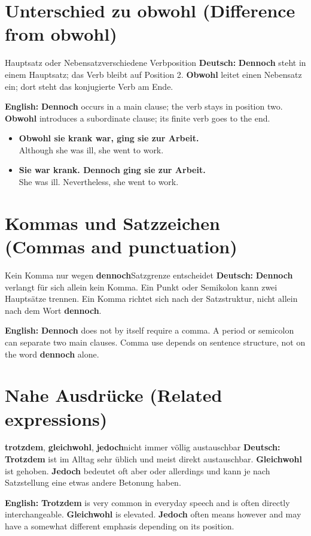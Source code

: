 \documentclass[a4paper,11pt]{article}
\newcommand{\GermanText}[1]{\textbf{Deutsch: }#1\par}\newcommand{\EnglishText}[1]{{\small\color{SoftGray}\textbf{English: }#1\par}}\newcommand{\ExampleItem}[2]{\item \textbf{#1}\\{\small\color{SoftGray}#2}}
\begin{document}
\section{Unterschied zu \glqq obwohl\grqq{} \textnormal{(Difference from \glqq obwohl\grqq)}}
\begin{grammarentry}{Hauptsatz oder Nebensatz}{verschiedene Verbposition}
\GermanText{\textbf{Dennoch} steht in einem Hauptsatz; das Verb bleibt auf Position 2. \textbf{Obwohl} leitet einen Nebensatz ein; dort steht das konjugierte Verb am Ende.}
\EnglishText{\textbf{Dennoch} occurs in a main clause; the verb stays in position two. \textbf{Obwohl} introduces a subordinate clause; its finite verb goes to the end.}
\end{grammarentry}
\begin{exbox}\begin{itemize}
\ExampleItem{Obwohl sie krank war, ging sie zur Arbeit.}{Although she was ill, she went to work.}
\ExampleItem{Sie war krank. Dennoch ging sie zur Arbeit.}{She was ill. Nevertheless, she went to work.}
\end{itemize}\end{exbox}

\section{Kommas und Satzzeichen \textnormal{(Commas and punctuation)}}
\begin{grammarentry}{Kein Komma nur wegen \textbf{dennoch}}{Satzgrenze entscheidet}
\GermanText{\textbf{Dennoch} verlangt für sich allein kein Komma. Ein Punkt oder Semikolon kann zwei Hauptsätze trennen. Ein Komma richtet sich nach der Satzstruktur, nicht allein nach dem Wort \textbf{dennoch}.}
\EnglishText{\textbf{Dennoch} does not by itself require a comma. A period or semicolon can separate two main clauses. Comma use depends on sentence structure, not on the word \textbf{dennoch} alone.}
\end{grammarentry}

\section{Nahe Ausdrücke \textnormal{(Related expressions)}}
\begin{grammarentry}{\textbf{trotzdem}, \textbf{gleichwohl}, \textbf{jedoch}}{nicht immer völlig austauschbar}
\GermanText{\textbf{Trotzdem} ist im Alltag sehr üblich und meist direkt austauschbar. \textbf{Gleichwohl} ist gehoben. \textbf{Jedoch} bedeutet oft \glqq aber\grqq{} oder \glqq allerdings\grqq{} und kann je nach Satzstellung eine etwas andere Betonung haben.}
\EnglishText{\textbf{Trotzdem} is very common in everyday speech and is often directly interchangeable. \textbf{Gleichwohl} is elevated. \textbf{Jedoch} often means \glqq however\grqq{} and may have a somewhat different emphasis depending on its position.}
\end{grammarentry}
\end{document}
